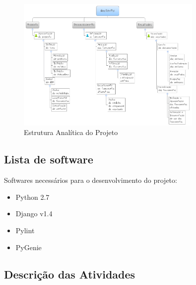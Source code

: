 
\begin{figure}[H]
	\label{eap}
	\centering
	\includegraphics[width=0.8\textwidth]{conteudo/EAP}
	\caption{Estrutura Analítica do Projeto}
\end{figure}


\subsection{Lista de software} %
\label{sub:lista_de_software}

Softwares necessários para o desenvolvimento do projeto:
\begin{itemize}
	\item Python 2.7
	\item Django v1.4
	\item Pylint
	\item PyGenie
\end{itemize}

\subsection{Descrição das Atividades} %
\label{sub:descri_o_das_atividades}


